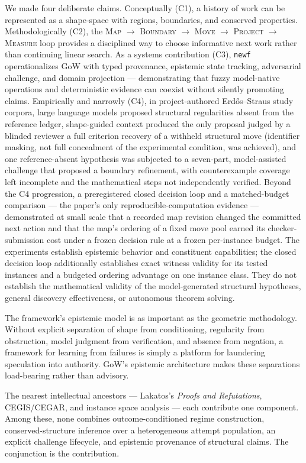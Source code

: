 \documentclass[11pt]{article}
\theoremstyle{gowthm}
\theoremstyle{gowplain}
\begin{document}
We made four deliberate claims. Conceptually (C1), a history of work can be
represented as a shape-space with regions, boundaries, and conserved properties.
Methodologically (C2), the \textsc{Map $\to$ Boundary $\to$ Move $\to$
Project $\to$ Measure} loop provides a disciplined way to choose informative
next work rather than continuing linear search. As a systems contribution (C3),
\texttt{newf} operationalizes GoW with typed provenance, epistemic state
tracking, adversarial challenge, and domain projection --- demonstrating that
fuzzy model-native operations and deterministic evidence can coexist without
silently promoting claims. Empirically and narrowly (C4), in project-authored
Erd\H{o}s--Straus study corpora, large language models proposed structural
regularities absent from the reference ledger, shape-guided context produced the
only proposal judged by a blinded reviewer a full criterion recovery of a
withheld structural
move (identifier masking, not full concealment of the experimental condition,
was achieved), and one reference-absent hypothesis was subjected to a seven-part,
model-assisted challenge that proposed a boundary refinement, with counterexample
coverage left incomplete and the mathematical steps not independently verified.
Beyond the C4 progression, a preregistered closed decision loop and a
matched-budget comparison --- the paper's only reproducible-computation
evidence --- demonstrated at small scale that a recorded map revision changed
the committed next action and that the map's ordering of a fixed move pool
earned its checker-submission cost under a frozen decision rule at a frozen
per-instance budget.
The experiments
establish epistemic behavior and constituent capabilities; the closed decision
loop additionally establishes exact witness validity for its tested instances
and a budgeted ordering advantage on one instance class. They do not establish
the mathematical validity of the model-generated structural hypotheses, general
discovery effectiveness, or autonomous theorem solving.

The framework's epistemic model is as important as the geometric methodology.
Without explicit separation of shape from conditioning, regularity from
obstruction, model judgment from verification, and absence from negation, a
framework for learning from failures is simply a platform for laundering
speculation into authority. GoW's epistemic architecture makes these
separations load-bearing rather than advisory.

The nearest intellectual ancestors --- Lakatos's \emph{Proofs and Refutations},
CEGIS/CEGAR, and instance space analysis --- each contribute one component.
Among these, none combines outcome-conditioned regime construction, conserved-structure
inference over a heterogeneous attempt population, an explicit challenge
lifecycle, and epistemic provenance of structural claims. The conjunction is
the contribution.
\end{document}

